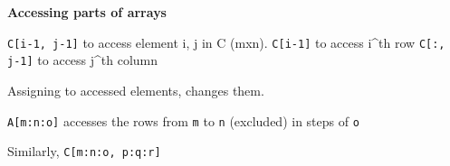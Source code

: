 \textbf{Accessing parts of arrays}

\lstinline|C[i-1, j-1]| to access element i, j in C (mxn).
\lstinline|C[i-1]| to access i^{th} row
\lstinline|C[:, j-1]| to access j^{th} column

Assigning to accessed elements, changes them. 

\lstinline|A[m:n:o]| accesses the rows from \lstinline|m|
to \lstinline|n| (excluded) in steps of \lstinline|o|

Similarly, \lstinline|C[m:n:o, p:q:r]|
